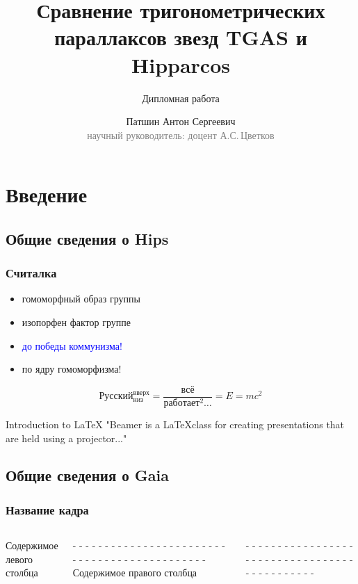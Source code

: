 \documentclass[14pt,aspectratio=43]{beamer}
\begin{document}
\title{Сравнение тригонометрических параллаксов звезд TGAS и Hipparcos}
\subtitle[Диплом]{Дипломная работа}
\author[А.С.\,Патшин]{Патшин Антон Сергеевич\\{\footnotesize\textcolor{gray}{научный руководитель: доцент А.С.\,Цветков}}}





\maketitle

\section{Введение}
\subsection{Общие сведения о Hips}
\label{sub:smthhip}
\begin{frame}\frametitle{Считалка} 

  \begin{itemize}
  \item гомоморфный образ группы
  \item изопорфен фактор группе
  \item {\Large \textcolor{blue}{до победы коммунизма!}}
  \item по ядру гомоморфизма!
  \end{itemize}
\begin{equation}
    Русский_{низ}^{вверх} = \frac{всё}{работает^2\dots} = E = m c^2
\end{equation}

\begin{block}{Introduction to {\LaTeX}}
"Beamer is a {\LaTeX}class for creating presentations that
are held using a projector..."
\end{block}
\end{frame}


\subsection{Общие сведения о Gaia}
\label{sub:smthgaia}
\begin{frame}\frametitle{Название кадра}

 	\begin{columns}
 			Содержимое левого столбца
 			
 			- - - - - - - - - - - - - - - - - - - - - - - - - - - - - - - - - - - - - - - - - - - - - 
 			Содержимое правого столбца
 			
 			- - - - - - - - - - - - - - - - - - - - - - - - - - - - - - - - - - - - - - - - - - - - - 
 	\end{columns}
\end{frame}
\end{document}
